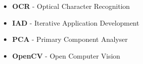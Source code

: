 

\begin{itemize}
	\item{\textbf{OCR} - Optical Character Recognition}
	\item{\textbf{IAD} - Iterative Application Development}
	\item{\textbf{PCA} - Primary Component Analyser}
	\item{\textbf{OpenCV} - Open Computer Vision}
\end{itemize}






